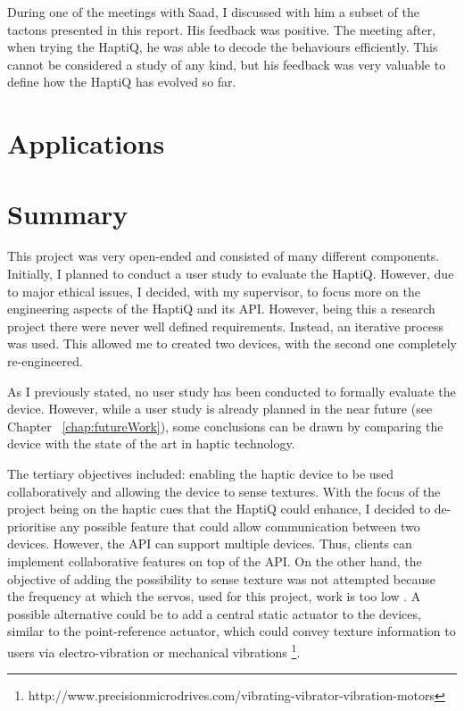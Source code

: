 During one of the meetings with Saad, I discussed with him a subset of the tactons presented in this report. His feedback was positive. The meeting after, when trying the HaptiQ, he was able to decode the behaviours efficiently. This cannot be considered a study of any kind, but his feedback was very valuable to define how the HaptiQ has evolved so far. 

\section{Applications}


\section{Summary}

This project was very open-ended and consisted of many different components. Initially, I planned to conduct a user study to evaluate the HaptiQ. However, due to major ethical issues, I decided, with my supervisor, to focus more on the engineering aspects of the HaptiQ and its API. However, being this a research project there were never well defined requirements. Instead, an iterative process was used. This allowed me to created two devices, with the second one completely re-engineered.   

As I previously stated, no user study has been conducted to formally evaluate the device. However, while a user study is already planned in the near future (see Chapter ~\ref{chap:futureWork}), some conclusions can be drawn by comparing the device with the state of the art in haptic technology. 


The tertiary objectives included: enabling the haptic device to be used collaboratively and allowing the device to sense textures. 
With the focus of the project being on the haptic cues that the HaptiQ could enhance, I decided to de-prioritise any possible feature that could allow communication between two devices. However, the API can support multiple devices. Thus, clients can implement  collaborative features on top of the API.
On the other hand, the objective of adding the possibility to sense texture was not attempted because the frequency at which the servos, used for this project, work is too low \cite{brown2005first}. A possible alternative could be to add a central static actuator to the devices, similar to the point-reference actuator, which could convey texture information to users via electro-vibration \cite{bau2010teslatouch, bau2012revel} or mechanical vibrations \footnote{http://www.precisionmicrodrives.com/vibrating-vibrator-vibration-motors}.   